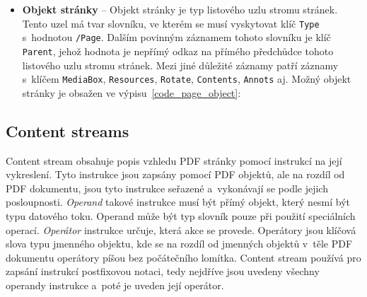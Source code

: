 \begin{itemize}
    \item \textbf{Objekt stránky} -- Objekt stránky je typ listového uzlu stromu
    stránek. Tento uzel má tvar slovníku, ve kterém se musí vyskytovat klíč
    \texttt{Type} s~hodnotou \texttt{/Page}. Dalším povinným záznamem tohoto
    slovníku je klíč \texttt{Parent}, jehož hodnota je nepřímý odkaz na přímého
    předchůdce tohoto listového uzlu stromu stránek. Mezi jiné důležité záznamy
    patří záznamy s~klíčem \texttt{MediaBox}, \texttt{Resources}, \texttt{Rotate},
    \texttt{Contents}, \texttt{Annots} aj.
    Možný objekt stránky je obsažen ve výpisu~\ref{code_page_object}:
\end{itemize}


\subsection*{Content streams} \label{content_streams}
Content stream obsahuje popis vzhledu PDF stránky pomocí instrukcí na její
vykreslení. Tyto instrukce jsou zapsány pomocí PDF objektů, ale na rozdíl od
PDF dokumentu, jsou tyto instrukce seřazené a~vykonávají se podle jejich
posloupnosti. \emph{Operand} takové instrukce musí být přímý objekt, který 
nesmí být typu datového toku. Operand může být typ slovník pouze při použití
speciálních operací. \emph{Operátor} instrukce určuje, která akce se provede.
Operátory jsou klíčová slova typu jmenného objektu, kde se na rozdíl od jmenných objektů v~těle 
PDF dokumentu operátory píšou bez počátečního lomítka. Content stream používá pro zapsání
instrukcí postfixovou notaci, tedy nejdříve jsou uvedeny všechny operandy instrukce
a~poté je uveden její operátor.


